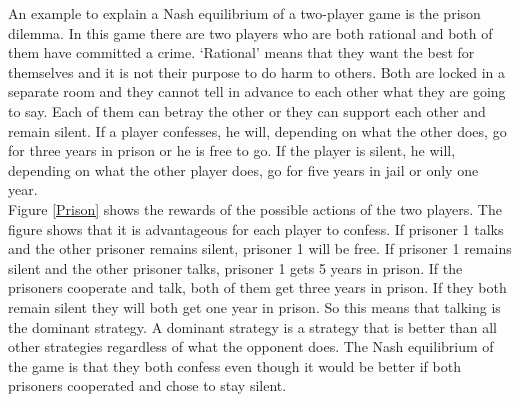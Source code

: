 An example to explain a Nash equilibrium of a two-player game is the prison dilemma. In this game there are two players who are both rational and both of them have committed a crime. `Rational' means that they want the best for themselves and it is not their purpose to do harm to others. Both are locked in a separate room and they cannot tell in advance to each other what they are going to say. Each of them can betray the other or they can support each other and remain silent. If a player confesses, he will, depending on what the other does, go for three years in prison or he is free to go. If the player is silent, he will, depending on what the other player does, go for five years in jail or only one year. \\


Figure \ref{Prison} shows the rewards of the possible actions of the two players. The figure shows that it is advantageous for each player to confess. If prisoner 1 talks and the other prisoner remains silent, prisoner 1 will be free. If prisoner 1 remains silent and the other prisoner talks, prisoner 1 gets 5 years in prison. If the prisoners cooperate and talk, both of them get three years in prison. If they both remain silent they will both get one year in prison. So this means that talking is the dominant strategy. A dominant strategy is a strategy that is better than all other strategies regardless of what the opponent does. The Nash equilibrium of the game is that they both confess even though it would be better if both prisoners cooperated and chose to stay silent. 

